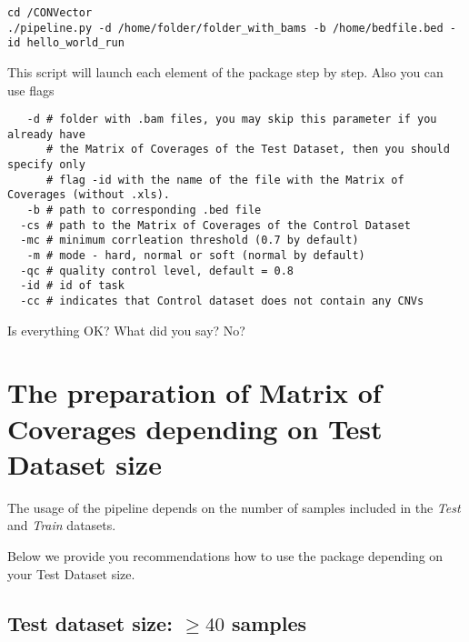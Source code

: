 \documentclass{article}
\begin{document}
\begin{lstlisting}[style=DOS, caption={Simple run of the package}]
cd /CONVector
./pipeline.py -d /home/folder/folder_with_bams -b /home/bedfile.bed -id hello_world_run 
\end{lstlisting}

This script will launch each element of the package step by step. Also you can use flags

\begin{verbatim}
   -d # folder with .bam files, you may skip this parameter if you already have 
      # the Matrix of Coverages of the Test Dataset, then you should specify only 
      # flag -id with the name of the file with the Matrix of Coverages (without .xls).
   -b # path to corresponding .bed file
  -cs # path to the Matrix of Coverages of the Control Dataset
  -mc # minimum corrleation threshold (0.7 by default)
   -m # mode - hard, normal or soft (normal by default)
  -qc # quality control level, default = 0.8
  -id # id of task
  -cc # indicates that Control dataset does not contain any CNVs
\end{verbatim}


Is everything OK? What did you say? No?





\newpage
\section{The preparation of Matrix of Coverages depending on Test Dataset size}

The usage of the pipeline depends on the number of samples included in the {\it Test} and {\it Train} datasets.



Below we provide you recommendations how to use the package depending on your Test Dataset size.




\subsection{Test dataset size: $\geq 40$ samples}
\end{document}
